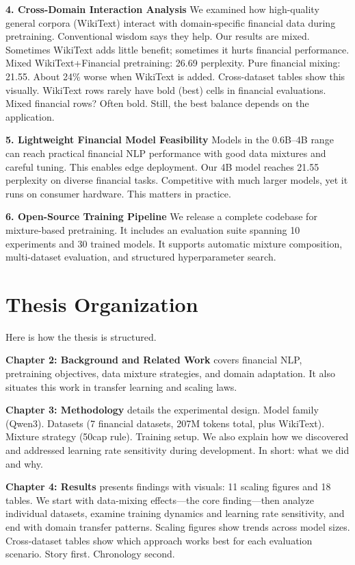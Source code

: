 \textbf{4. Cross-Domain Interaction Analysis}
We examined how high-quality general corpora (WikiText) interact with domain-specific financial data during pretraining. Conventional wisdom says they help. Our results are mixed. Sometimes WikiText adds little benefit; sometimes it hurts financial performance. Mixed WikiText+Financial pretraining: 26.69 perplexity. Pure financial mixing: 21.55. About 24\% worse when WikiText is added. Cross-dataset tables show this visually. WikiText rows rarely have bold (best) cells in financial evaluations. Mixed financial rows? Often bold. Still, the best balance depends on the application.

\textbf{5. Lightweight Financial Model Feasibility}
Models in the 0.6B--4B range can reach practical financial NLP performance with good data mixtures and careful tuning. This enables edge deployment. Our 4B model reaches 21.55 perplexity on diverse financial tasks. Competitive with much larger models, yet it runs on consumer hardware. This matters in practice.

\textbf{6. Open-Source Training Pipeline}
We release a complete codebase for mixture-based pretraining. It includes an evaluation suite spanning 10 experiments and 30 trained models. It supports automatic mixture composition, multi-dataset evaluation, and structured hyperparameter search.

\section{Thesis Organization}

Here is how the thesis is structured.

\textbf{Chapter 2: Background and Related Work} covers financial NLP, pretraining objectives, data mixture strategies, and domain adaptation. It also situates this work in transfer learning and scaling laws.

\textbf{Chapter 3: Methodology} details the experimental design. Model family (Qwen3). Datasets (7 financial datasets, 207M tokens total, plus WikiText). Mixture strategy (50cap rule). Training setup. We also explain how we discovered and addressed learning rate sensitivity during development. In short: what we did and why.

\textbf{Chapter 4: Results} presents findings with visuals: 11 scaling figures and 18 tables. We start with data-mixing effects—the core finding—then analyze individual datasets, examine training dynamics and learning rate sensitivity, and end with domain transfer patterns. Scaling figures show trends across model sizes. Cross-dataset tables show which approach works best for each evaluation scenario. Story first. Chronology second.

